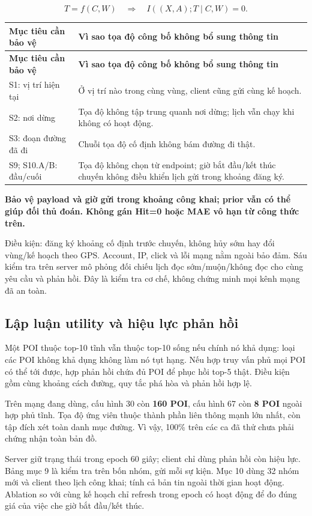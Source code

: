\documentclass[10pt,a4paper]{article}
\newcommand{\key}[1]{\par\smallskip\noindent\colorbox{pale}{\parbox{\dimexpr\linewidth-2\fboxsep}{\textbf{#1}}}\par\smallskip}
\begin{document}
\[
T=f(C,W)\quad\Longrightarrow\quad I((X,A);T\mid C,W)=0.
\]
\begingroup\small
\begin{longtable}{@{}P{4.505cm}P{12.414cm}@{}}
\toprule
\textbf{Mục tiêu cần bảo vệ} & \textbf{Vì sao tọa độ công bố không bổ sung thông tin}\\\midrule
\endfirsthead
\toprule
\textbf{Mục tiêu cần bảo vệ} & \textbf{Vì sao tọa độ công bố không bổ sung thông tin}\\\midrule
\endhead
\bottomrule\endfoot
S1: vị trí hiện tại & Ở vị trí nào trong cùng vùng, client cũng gửi cùng kế hoạch.\\
\addlinespace[3pt]
S2: nơi dừng & Tọa độ không tập trung quanh nơi dừng; lịch vẫn chạy khi không có hoạt động.\\
\addlinespace[3pt]
S3: đoạn đường đã đi & Chuỗi tọa độ cố định không bám đường đi thật.\\
\addlinespace[3pt]
S9; S10.A/B: đầu/cuối & Tọa độ không chọn từ endpoint; giờ bắt đầu/kết thúc chuyến không điều khiển lịch gửi trong khoảng đăng ký.\\
\end{longtable}
\endgroup
\key{Bảo vệ payload và giờ gửi trong khoảng công khai; prior vẫn có thể giúp đối thủ đoán. Không gán Hit=0 hoặc MAE vô hạn từ công thức trên.}

Điều kiện: đăng ký khoảng cố định trước chuyến, không hủy sớm hay đổi vùng/kế hoạch theo GPS. Account, IP, click và lỗi mạng nằm ngoài bảo đảm. Sáu kiểm tra trên server mô phỏng đối chiếu lịch đọc sớm/muộn/không đọc cho cùng yêu cầu và phản hồi. Đây là kiểm tra cơ chế, không chứng minh mọi kênh mạng đã an toàn.

\subsection{Lập luận utility và hiệu lực phản hồi}
Một POI thuộc top-10 tĩnh vẫn thuộc top-10 sống nếu chính nó khả dụng: loại các POI không khả dụng không làm nó tụt hạng. Nếu hợp truy vấn phủ mọi POI có thể tới được, hợp phản hồi chứa đủ POI để phục hồi top-5 thật. Điều kiện gồm cùng khoảng cách đường, quy tắc phá hòa và phản hồi hợp lệ.

Trên mạng đang dùng, cấu hình 30 còn \textbf{160 POI}, cấu hình 67 còn \textbf{8 POI} ngoài hợp phủ tĩnh. Tọa độ ứng viên thuộc thành phần liên thông mạnh lớn nhất, còn tập đích xét toàn danh mục đường. Vì vậy, 100\% trên các ca đã thử chưa phải chứng nhận toàn bản đồ.

Server giữ trạng thái trong epoch 60 giây; client chỉ dùng phản hồi còn hiệu lực. Bảng mục 9 là kiểm tra trên bốn nhóm, gửi mỗi sự kiện. Mục 10 dùng 32 nhóm mới và client theo lịch công khai; tính cả bản tin ngoài thời gian hoạt động. Ablation so với cùng kế hoạch chỉ refresh trong epoch có hoạt động để đo đúng giá của việc che giờ bắt đầu/kết thúc.
\end{document}
